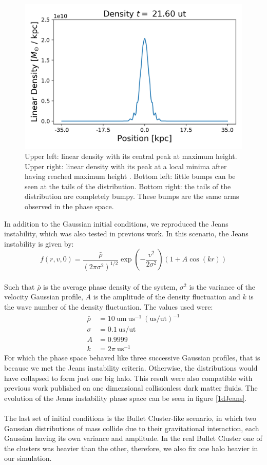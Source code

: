 \begin{figure}[h!]
    \includegraphics[scale=0.45]{imag/gaussD54.png}
    \caption{Upper left: linear density with its central peak at maximum height. Upper right: linear density with its peak at a local minima after having reached maximum height . Bottom left: little bumps can be seen at the tails of the distribution. Bottom right: the tails of the distribution are completely bumpy. These bumps are the same arms observed in the phase space.}
    \label{1dDens}
\end{figure}

In addition to the Gaussian initial conditions, we reproduced the Jeans instability, which was also tested in previous work. In this scenario, the Jeans instability is given by:
\begin{equation}
f(r,v,0) = \frac{\bar{\rho}}{(2 \pi \sigma^2)^{1/2}} \exp(-\frac{v^2}{2 \sigma^2}) (1 + A \cos(kr))
\end{equation}\\
\vspace{-1mm}Such that $\bar{\rho}$ is the average phase density of the system, $\sigma^2$ is the variance of the velocity Gaussian profile, $A$ is the amplitude of the density fluctuation and $k$ is the wave number of the density fluctuation. The values used were:
\begin{align}
\bar{\rho} &= 10 \  \text{um} \ \text{us}^{-1} \ (\text{us/ut})^{-1} \\
\sigma &= 0.1 \ \text{us/ut} \\
A &= 0.9999 \\
k &= 2 \pi \ \text{us}^{-1}
\end{align}
For which the phase space behaved like three successive Gaussian profiles, that is because we met the Jeans instability criteria. Otherwise, the distributions would have collapsed to form just one big halo. This result were also compatible with previous work published on one dimensional collisionless dark matter fluids. The evolution of the Jeans instability phase space can be seen in figure \ref{1dJeans}.\\
\\The last set of initial conditions is the Bullet Cluster-like scenario, in which two Gaussian distributions of mass collide due to their gravitational interaction, each Gaussian having its own variance and amplitude.
In the real Bullet Cluster one of the clusters was heavier than the other, therefore, we also fix one halo heavier in our simulation.

